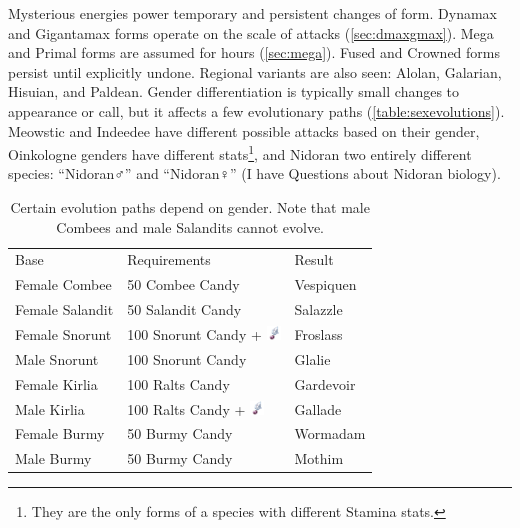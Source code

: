 Mysterious energies power temporary and persistent changes of form.
Dynamax and Gigantamax forms operate on the scale of attacks (\autoref{sec:dmaxgmax}).
Mega and Primal forms are assumed for hours (\autoref{sec:mega}).
Fused and Crowned forms persist until explicitly undone.
Regional variants are also seen: Alolan, Galarian, Hisuian, and Paldean.
Gender differentiation is typically small changes to appearance or call,
 but it affects a few evolutionary paths (\autoref{table:sexevolutions}).
Meowstic and Indeedee have different possible attacks based on their gender,
 Oinkologne genders have different stats\footnote{They are the only forms of a species with different Stamina stats.}, and Nidoran two entirely different
 species: ``Nidoran♂'' and ``Nidoran♀'' (I have Questions about Nidoran biology).
\begin{table}
\footnotesize
\centering
\begin{tabular}{lll}
Base & Requirements & Result \\
\Midrule
Female Combee	& 50 Combee Candy & Vespiquen\\
Female Salandit & 50 Salandit Candy & Salazzle\\
Female Snorunt & 100 Snorunt Candy + \includegraphics[width=1em,height=1em]{images/sinnohstone.png} & Froslass\\
Male Snorunt & 100 Snorunt Candy & Glalie\\
Female Kirlia & 100 Ralts Candy & Gardevoir\\
Male Kirlia & 100 Ralts Candy + \includegraphics[width=1em,height=1em]{images/sinnohstone.png} & Gallade\\
Female Burmy & 50 Burmy Candy & Wormadam\\
Male Burmy & 50 Burmy Candy & Mothim\\
\end{tabular}
\caption[Gender-dependent evolutions]{Certain evolution paths depend on gender. Note that male Combees and male Salandits cannot evolve.\label{table:sexevolutions}}
\end{table}

